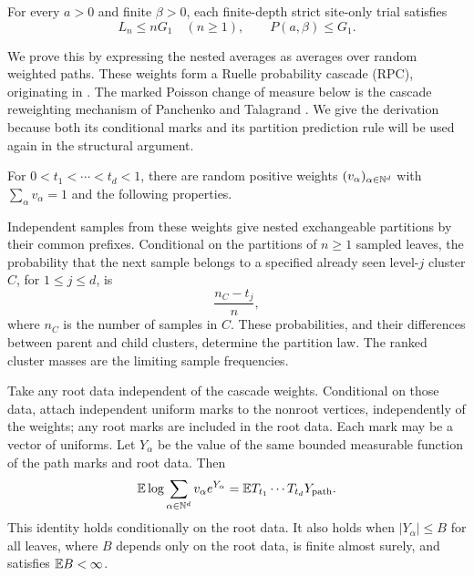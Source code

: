 \begin{proposition}
\label{ctr:upper}
For every $a>0$ and finite $\beta>0$, each finite-depth strict site-only
trial satisfies
\begin{equation}
 L_n\le nG_1\quad(n\ge1),\qquad P(a,\beta)\le G_1.
 \label{ctr:upper-bound}
\end{equation}
\end{proposition}

We prove this by expressing the nested averages as averages over random
weighted paths.  These weights form a Ruelle probability
cascade (RPC), originating in \cite{Ruelle1987}.  The marked Poisson change of
measure below is the cascade reweighting mechanism of Panchenko and Talagrand
\cite[Lemmas~2.1 and~3.1]{PanchenkoTalagrand2007}.  We give the derivation
because both its conditional marks and its partition prediction rule will
be used again in the structural argument.

\begin{lemma}
\label{ctr:rpc}
For $0<t_1<\cdots<t_d<1$, there are random positive weights
$(v_\alpha)_{\alpha\in\mathbb N^d}$ with $\sum_\alpha v_\alpha=1$ and the
following properties.

Independent samples from these weights give nested exchangeable partitions
by their common prefixes.  Conditional on the partitions of $n\ge1$ sampled
leaves, the probability that the next sample belongs to a specified already
seen level-$j$ cluster $C$, for $1\le j\le d$, is
\begin{equation}
 \frac{n_C-t_j}{n},
 \label{ctr:prediction}
\end{equation}
where $n_C$ is the number of samples in $C$.  These probabilities, and their
differences between parent and child clusters, determine the partition law.
The ranked cluster masses are the limiting sample frequencies.

Take any root data independent of the cascade weights.  Conditional on
those data, attach independent uniform marks to the nonroot vertices,
independently of the weights; any root marks are included in the root data.
Each mark may be a vector of uniforms.  Let $Y_\alpha$ be the value of the
same bounded measurable function of the path marks and root data.  Then
\begin{equation}
 \mathbb E\log\sum_{\alpha\in\mathbb N^d}v_\alpha e^{Y_\alpha}
   =\mathbb E T_{t_1}\cdots T_{t_d}Y_{\mathrm{path}}.
 \label{ctr:rpc-log}
\end{equation}
This identity holds conditionally on the root data.  It also holds when
$|Y_\alpha|\le B$ for all leaves, where $B$ depends only on the root data,
is finite almost surely, and satisfies $\mathbb E B<\infty$.
\end{lemma}

